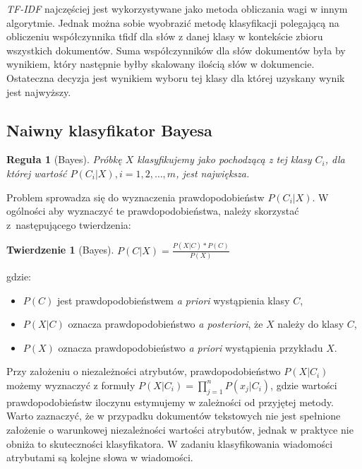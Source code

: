 \documentclass[a4paper,12pt]{article}
\newtheorem{rg}{Reguła}
\newtheorem{twr}{Twierdzenie}
\begin{document}
\textit{TF-IDF} najczęściej jest wykorzystywane jako metoda obliczania wagi w innym algorytmie. Jednak można sobie wyobrazić metodę klasyfikacji polegającą na obliczeniu współczynnika tfidf dla słów z danej klasy w kontekście zbioru wszystkich dokumentów. Suma współczynników dla słów dokumentów była by wynikiem, który następnie byłby skalowany ilością słów w dokumencie. Ostateczna decyzja jest wynikiem wyboru tej klasy dla której
uzyskany wynik jest najwyższy.
  
\subsection{Naiwny klasyfikator Bayesa}
 
\begin{rg}[Bayes]
Próbkę $X$ klasyfikujemy jako pochodzącą z tej klasy $C_i$, dla której wartość $P(C_i|X), i = 1, 2, \dots, m$, jest największa.
\end{rg}
 
Problem sprowadza się do wyznaczenia prawdopodobieństw $P(C_i|X)$.
W ogólności aby wyznaczyć te prawdopodobieństwa, należy skorzystać z~następującego twierdzenia:

\begin{twr}[Bayes]
$P(C|X) = \frac{P(X|C)*P(C)}{P(X)}$
\end{twr}
 
gdzie:

\begin{itemize}
\item \textbf{$P(C)$} jest prawdopodobieństwem \textit{a priori} wystąpienia
klasy $C$,
\item \textbf{$P(X|C)$} oznacza prawdopodobieństwo \textit{a posteriori}, że
$X$ należy do klasy $C$,
\item \textbf{$P(X)$} oznacza prawdopodobieństwo \textit{a priori} wystąpienia przykładu $X$.
\end{itemize} 
 
Przy założeniu o niezależności atrybutów, prawdopodobieństwo $P(X|C_i)$ możemy wyznaczyć z formuły $P(X|C_i) = \prod\limits_{j=1}^n P(x_j|C_i)$, gdzie wartości prawdopodobieństw iloczynu estymujemy
w zależności od przyjętej metody.\\

Warto zaznaczyć, że w przypadku dokumentów tekstowych nie jest spełnione założenie o warunkowej niezależności wartości atrybutów, jednak w praktyce nie obniża to skuteczności klasyfikatora. W zadaniu klasyfikowania wiadomości atrybutami są kolejne słowa w wiadomości.\\
\end{document}
